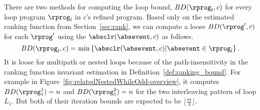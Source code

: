 
There are two methods for computing the loop bound, $BD(\rprog_l, c)$ for every loop program $\rprog_l$ in $c$'s refined program.
%
Based only on the estimated ranking function from Section~\ref{sec:rank}, we can compute a loose $BD(\rprog', c)$ for each $\rprog'$
using the $\absclr(\absevent, c)$ as follows.
\begin{equation}
 \label{eq:absBD}
 BD(\rprog_l, c) = \min\left\{ \absclr(\absevent, c) \middle\vert \absevent \in \rprog_l \right\}.
\end{equation}
It is loose for multipath or nested loops because of the path-insensitivity in the ranking function invariant estimation in Definition~\ref{def:ranking_bound}. 
For example in Figure~\ref{fig:relatedNestedWhileOdd-overview},
it computes $BD(\rprog_1^1) = n$ and $BD(\rprog_1^2) = n $ for the two interleaving pattern of loop $L_1$.
But both of their iteration bounds are expected to be $\lfloor\frac{m}{4}\rfloor$.

